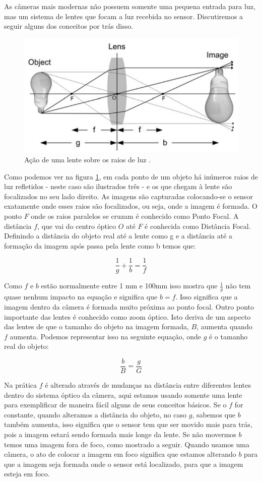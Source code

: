 \documentclass[
  brazilian,
]{book}
\begin{document}
As câmeras mais modernas não possuem somente uma pequena entrada para luz, mas um sistema de lentes que focam a luz recebida no sensor. Discutiremos a seguir alguns dos conceitos por trás disso.



\begin{figure}

{\centering \includegraphics[width=0.55\linewidth]{imagens/02-formacao/lente} 

}

\caption{Ação de uma lente sobre os raios de luz \autocite[p.12]{moeslund2012}.}\label{fig:lente}
\end{figure}

Como podemos ver na figura \ref{fig:lente}, em cada ponto de um objeto há inúmeros raios de luz refletidos - neste caso são ilustrados três - e os que chegam à lente são focalizados no seu lado direito. As imagens são capturadas colocando-se o sensor exatamente onde esses raios são focalizados, ou seja, onde a imagem é formada.
O ponto \(F\) onde os raios paralelos se cruzam é conhecido como Ponto Focal. A distância \(f\), que vai do centro óptico \(O\) até \(F\) é conhecida como Distância Focal.
Definindo a distância do objeto real até a lente como g e a distância até a formação da imagem após passa pela lente como b temos que:

\[\frac{1}{g}+\frac{1}{b}=\frac{1}{f}\]

Como \(f\) e \(b\) estão normalmente entre 1 mm e 100mm isso mostra que \(\frac{1}{g}\) não tem quase nenhum impacto na equação e significa que \(b = f\). Isso significa que a imagem dentro da câmera é formada muito próxima ao ponto focal.
Outro ponto importante das lentes é conhecido como zoom óptico. Isto deriva de um aspecto das lentes de que o tamanho do objeto na imagem formada, \(B\), aumenta quando \(f\) aumenta. Podemos representar isso na seguinte equação, onde \(g\) é o tamanho real do objeto:

\[\frac{b}{B}=\frac{g}{G}\]

Na prática \(f\) é alterado através de mudanças na distância entre diferentes lentes dentro do sistema óptico da câmera, aqui estamos usando somente uma lente para exemplificar de maneira fácil alguns de seus conceitos básicos.
Se o \(f\) for constante, quando alteramos a distância do objeto, no caso \(g\), sabemos que \(b\) também aumenta, isso significa que o sensor tem que ser movido mais para trás, pois a imagem estará sendo formada mais longe da lente. Se não movermos \(b\) temos uma imagem fora de foco, como mostrado a seguir. Quando usamos uma câmera, o ato de colocar a imagem em foco significa que estamos alterando \(b\) para que a imagem seja formada onde o sensor está localizado, para que a imagem esteja em foco.
\end{document}
